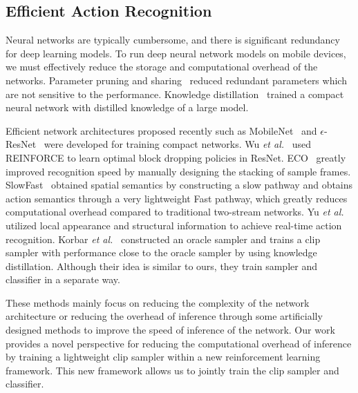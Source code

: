 \documentclass[journal]{IEEEtran}
\begin{document}
\subsection{Efficient Action Recognition}
Neural networks are typically cumbersome, and there is significant redundancy for deep learning models.
To run deep neural network models on mobile devices, we must effectively reduce the storage and computational overhead of the networks.
Parameter pruning and sharing~\cite{SrinivasB15,HanPTD15,ChenWTWC15,LebedevL16,WuNKRDGF18} reduced redundant parameters which are not sensitive to the performance.
Knowledge distillation~\cite{HintonVD15,RomeroBKCGB14,BalanRMW15,LuoZLWT16,ChenGS15} trained a compact neural network with distilled knowledge of a large model.

Efficient network architectures proposed recently such as MobileNet~\cite{HowardZCKWWAA17} and $\epsilon$-ResNet~\cite{YuYR18} were developed for training compact networks.
Wu \emph{et al.}~\cite{WuNKRDGF18} used REINFORCE to learn optimal block dropping policies in ResNet.
ECO~\cite{ZolfaghariSB18} greatly improved recognition speed by manually designing the stacking of sample frames.
SlowFast~\cite{Feichtenhofer0M19} obtained spatial semantics by constructing a slow pathway and obtains action semantics through a very lightweight Fast pathway, which greatly reduces computational overhead compared to traditional two-stream networks.
Yu \emph{et al.}~\cite{YuKC10} utilized local appearance and structural information to achieve real-time action recognition.
Korbar \emph{et al.}~\cite{SCSampler} constructed an oracle sampler and trains a clip sampler with performance close to the oracle sampler by using knowledge distillation. Although their idea is similar to ours, they train sampler and classifier in a separate way.

These methods mainly focus on reducing the complexity of the network architecture or reducing the overhead of inference through some artificially designed methods to improve the speed of inference of the network.
Our work provides a novel perspective for reducing the computational overhead of inference by training a lightweight clip sampler within a new reinforcement learning framework. This new framework allows us to jointly train the clip sampler and classifier.
\end{document}
